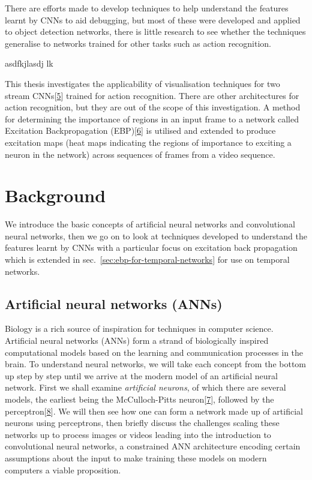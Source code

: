 \documentclass[A4paper,draft]{scrreprt}
\begin{document}
There are efforts made to develop techniques to help understand the
features learnt by CNNs to aid debugging, but most of these were
developed and applied to object detection networks, there is little
research to see whether the techniques generalise to networks trained
for other tasks such as action recognition.

asdfkjlasdj lk

This thesis investigates the applicability of visualisation techniques
for two stream
CNNs{[}\protect\hyperlink{ref-simonyan2014_TwoStreamConvolutionalNetworks}{5}{]}
trained for action recognition. There are other architectures for action
recognition, but they are out of the scope of this investigation. A
method for determining the importance of regions in an input frame to a
network called Excitation Backpropagation
(EBP){[}\protect\hyperlink{ref-zhang2016_TopdownNeuralAttention}{6}{]}
is utilised and extended to produce excitation maps (heat maps
indicating the regions of importance to exciting a neuron in the
network) across sequences of frames from a video sequence.

\chapter{Background}\label{sec:background}

We introduce the basic concepts of artificial neural networks and
convolutional neural networks, then we go on to look at techniques
developed to understand the features learnt by CNNs with a particular
focus on excitation back propagation which is extended in
sec.~\ref{sec:ebp-for-temporal-networks} for use on temporal networks.

\section{Artificial neural networks (ANNs)}\label{sec:background:ann}

Biology is a rich source of inspiration for techniques in computer
science. Artificial neural networks (ANNs) form a strand of biologically
inspired computational models based on the learning and communication
processes in the brain. To understand neural networks, we will take each
concept from the bottom up step by step until we arrive at the modern
model of an artificial neural network. First we shall examine
\emph{artificial neurons}, of which there are several models, the
earliest being the McCulloch-Pitts
neuron{[}\protect\hyperlink{ref-mcculloch1943_logicalcalculusideas}{7}{]},
followed by the
perceptron{[}\protect\hyperlink{ref-rosenblatt1957_Perceptronperceivingrecognising}{8}{]}.
We will then see how one can form a network made up of artificial
neurons using perceptrons, then briefly discuss the challenges scaling
these networks up to process images or videos leading into the
introduction to convolutional neural networks, a constrained ANN
architecture encoding certain assumptions about the input to make
training these models on modern computers a viable proposition.
\end{document}
